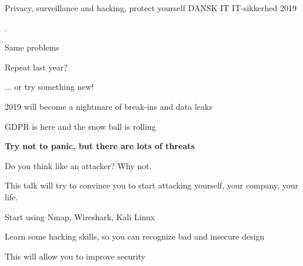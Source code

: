 \documentclass[Screen16to9,17pt,footrule]{foils}
\begin{document}



\mytitlepage
{Privacy, surveillance and hacking, protect yourself}
{DANSK IT IT-sikkerhed 2019}


.

\begin{list2}
\item Same problems
\item Repeat last year?
\item ... or try something new!
\item 2019 will become a nightmare of break-ins and data leaks
\item GDPR is here and the snow ball is rolling
\end{list2}

\vskip 1cm
{\LARGE\bf Try not to panic, but there are lots of threats}


\vskip 2cm

\begin{center}

\bf\Large

Do you think like an attacker?
\vskip 5mm
Why not.
\end{center}

\begin{list2}
\item This talk will try to convince you to start attacking yourself, your company, your life.
\item Start using Nmap, Wireshark, Kali Linux
\item Learn some hacking skills, so you can recognize bad and insecure design
\item This will allow you to improve security
\end{list2}




\end{document}
